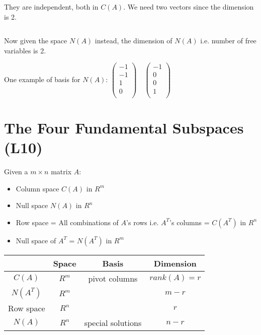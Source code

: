\documentclass[12pt]{article}
\begin{document}
They are independent, both in $C(A)$. We need two vectors since the dimension is 2.

$\>$

Now given the space $N(A)$ instead, the dimension of $N(A)$ i.e. number of free variables is 2. 

One example of basis for $N(A)$:
$\left(
    \begin{matrix}
        -1\\
        -1\\
        1\\
        0\\
    \end{matrix}
\right)
\quad
\left(
    \begin{matrix}
        -1\\
        0\\
        0\\
        1\\
    \end{matrix}
\right)$

\newpage

\section{The Four Fundamental Subspaces (L10)}

Given a $m\times{n}$ matrix $A$:

\begin{itemize}
    \item Column space $C(A)$ in $R^m$
    \item Null space $N(A)$ in $R^n$
    \item Row space = All combinations of $A$'s rows i.e. $A^T$'s columns = $C(A^T)$ in $R^n$
    \item Null space of $A^T$ = $N(A^T)$ in $R^m$
\end{itemize}

\begin{center}
  \begin{tabular}{|c|c|c|c|}
    \hline
    & Space & Basis & Dimension \\ \hline
    $C(A)$ & $R^m$ & pivot columns & $rank(A)=r$ \\ \hline
    $N(A^T)$ & $R^m$ & & $m-r$ \\ \hline
    Row space & $R^n$ & & $r$ \\ \hline 
    $N(A)$ & $R^n$ & special solutions & $n-r$ \\ \hline
  \end{tabular}
\end{center}
\end{document}
